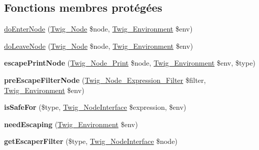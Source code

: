\subsection*{Fonctions membres protégées}
\begin{DoxyCompactItemize}
\item 
\hyperlink{class_twig___node_visitor___escaper_a58d59325d3add0c1004f6a5cfb2562af}{do\+Enter\+Node} (\hyperlink{class_twig___node}{Twig\+\_\+\+Node} \$node, \hyperlink{class_twig___environment}{Twig\+\_\+\+Environment} \$env)
\item 
\hyperlink{class_twig___node_visitor___escaper_a7e9db0312cbd70344096235921930dd2}{do\+Leave\+Node} (\hyperlink{class_twig___node}{Twig\+\_\+\+Node} \$node, \hyperlink{class_twig___environment}{Twig\+\_\+\+Environment} \$env)
\item 
{\bfseries escape\+Print\+Node} (\hyperlink{class_twig___node___print}{Twig\+\_\+\+Node\+\_\+\+Print} \$node, \hyperlink{class_twig___environment}{Twig\+\_\+\+Environment} \$env, \$type)\hypertarget{class_twig___node_visitor___escaper_aa8c0b3e95013477df545adf86975eeea}{}\label{class_twig___node_visitor___escaper_aa8c0b3e95013477df545adf86975eeea}

\item 
{\bfseries pre\+Escape\+Filter\+Node} (\hyperlink{class_twig___node___expression___filter}{Twig\+\_\+\+Node\+\_\+\+Expression\+\_\+\+Filter} \$filter, \hyperlink{class_twig___environment}{Twig\+\_\+\+Environment} \$env)\hypertarget{class_twig___node_visitor___escaper_a733f6ed9e40407782a76a2b7a547297f}{}\label{class_twig___node_visitor___escaper_a733f6ed9e40407782a76a2b7a547297f}

\item 
{\bfseries is\+Safe\+For} (\$type, \hyperlink{interface_twig___node_interface}{Twig\+\_\+\+Node\+Interface} \$expression, \$env)\hypertarget{class_twig___node_visitor___escaper_a534f16ca20412d8dc20ed1debaf6fa78}{}\label{class_twig___node_visitor___escaper_a534f16ca20412d8dc20ed1debaf6fa78}

\item 
{\bfseries need\+Escaping} (\hyperlink{class_twig___environment}{Twig\+\_\+\+Environment} \$env)\hypertarget{class_twig___node_visitor___escaper_ab5954ee5479cde965b278d436387e592}{}\label{class_twig___node_visitor___escaper_ab5954ee5479cde965b278d436387e592}

\item 
{\bfseries get\+Escaper\+Filter} (\$type, \hyperlink{interface_twig___node_interface}{Twig\+\_\+\+Node\+Interface} \$node)\hypertarget{class_twig___node_visitor___escaper_a2a244aea72aab9d1b6de91ffd4babfaf}{}\label{class_twig___node_visitor___escaper_a2a244aea72aab9d1b6de91ffd4babfaf}

\end{DoxyCompactItemize}
